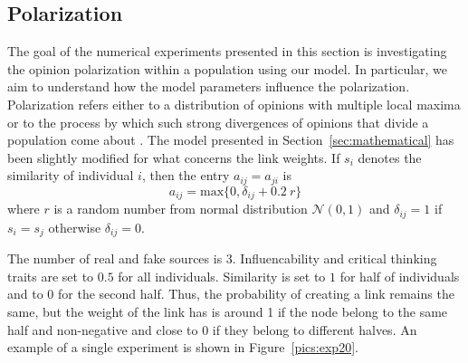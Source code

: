 \subsection{Polarization}
\label{sec:polarization}
The goal of the numerical experiments presented in this section is investigating the opinion polarization within a population using our model. In particular, we aim to understand how the model parameters influence the polarization. 
Polarization refers either to a distribution of opinions with multiple local maxima or to the process by which such strong divergences of opinions that divide a population come about \cite{Banisch2019}\cite{Bramsona2016}. The model presented in Section~\ref{sec:mathematical} has been slightly modified for what concerns the link weights. If $s_i$ denotes the similarity of individual $i$, then the entry $a_{ij} = a_{ji}$ is 
\begin{equation}
a_{ij} = \text{max}\{0, \delta_{ij} + 0.2\ r\}
\end{equation}
where $r$ is a random number from normal distribution $\mathcal{N}(0,1)$ and $\delta_{ij} = 1$ if $s_i = s_j$ otherwise $\delta_{ij} = 0$. 

The number of real and fake sources is 3. Influencability and critical thinking traits are set to $0.5$ for all individuals. Similarity is set to $1$ for half of individuals and to $0$ for the second half. Thus, the probability of creating a link remains the same, but the weight of the link has is around 1 if the node belong to the same half and non-negative and close to 0 if they belong to different halves. An example of a single experiment is shown in Figure~\ref{pics:exp20}.\\

